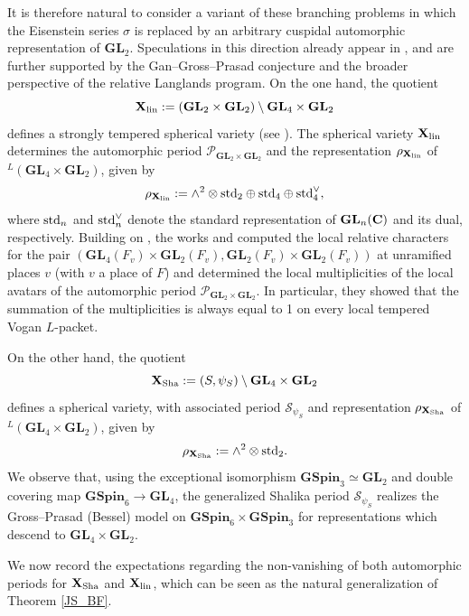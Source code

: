 \documentclass[11pt, reqno]{amsart}
\theoremstyle{plain}
\theoremstyle{definition}
\theoremstyle{remark}
\theoremstyle{plain}
\def\C{{\bf C}}
\def\GSpin{{\mathbf{GSpin}}}
\def\GL{\mathbf{GL}}
\begin{document}
It is therefore natural to consider a variant of these branching problems in which the Eisenstein series $\sigma$ is replaced by an arbitrary cuspidal automorphic representation of $\GL_2$. Speculations in this direction already appear in \cite[\S 8]{Chen-Gan}, and are further supported by the Gan--Gross--Prasad conjecture and the broader perspective of the relative Langlands program. On the one hand, the quotient
\[\mathbf{X}_{\rm lin} := (\GL_2\times \GL_2)\setminus \GL_4 \times \GL_2\]
defines a strongly tempered spherical variety (see \cite[Table 1]{Wan:Zhang:Spherical:Periods}). The spherical variety $\mathbf{X}_{\rm lin}$ determines the automorphic period $\mathcal{P}_{\GL_2\times \GL_2}$ and the representation $\rho_{\mathbf{X}_{\rm lin}}$ of $^L(\GL_4 \times \GL_2)$, given by $$\rho_{\mathbf{X}_{\rm lin}} := \wedge^2 \otimes {\rm std}_2 \oplus {\rm std}_4 \oplus {\rm std}_4^\vee,$$
where ${\rm std}_n$  and ${\rm std}_n^\vee$ denote the standard representation of $\GL_n(\C)$ and its dual, respectively. Building on \cite{SakellaridisVenkatesh}, the works \cite{Wan:Zhang:Spherical:Periods} and \cite{Pollack:Wan:Zydor} computed the local relative characters for the pair $(\GL_4(F_v) \times \GL_2(F_v),\GL_2(F_v) \times \GL_2(F_v))$ at unramified places $v$ (with $v$ a place of $F$) and determined the local multiplicities of the local avatars of the automorphic period $\mathcal{P}_{\GL_2\times \GL_2}$.  In particular, they showed that the summation of the multiplicities is always equal to 1 on every local tempered Vogan $L$-packet. 




On the other hand, the quotient $$\mathbf{X}_{\rm Sha} := (S,\psi_S)\setminus \GL_4 \times \GL_2$$
defines a spherical variety, with associated period ${\mathcal{S}_{\psi_S}}$ and representation $\rho_{\mathbf{X}_{\rm Sha}}$ of $^L(\GL_4 \times \GL_2)$, given by $$\rho_{\mathbf{X}_{\rm Sha}} := \wedge^2 \otimes {\rm std}_2.$$
We observe that, using the exceptional isomorphism $\GSpin_3 \simeq \GL_2$ and double covering map $\GSpin_6 \to \GL_4$, the generalized Shalika period ${\mathcal{S}_{\psi_S}}$ realizes the Gross--Prasad (Bessel) model on $\GSpin_6 \times \GSpin_3$ for representations which descend to $\GL_4 \times \GL_2$. 

We now record the expectations regarding the non-vanishing of both automorphic periods for $\mathbf{X}_{\rm Sha}$ and $\mathbf{X}_{\rm lin}$, which can be seen as the natural generalization of Theorem \ref{JS_BF}.
\end{document}
